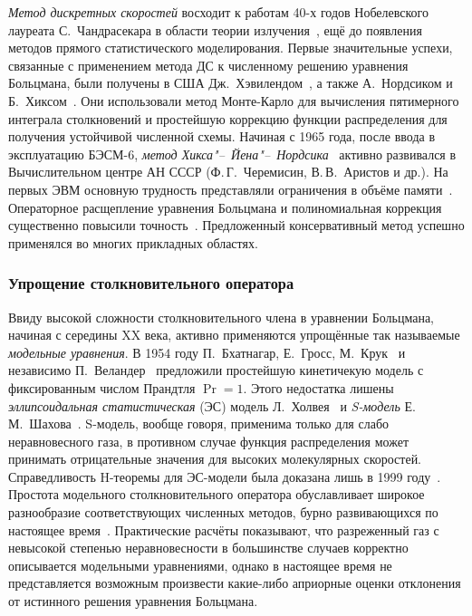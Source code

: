 \emph{Метод дискретных скоростей} восходит к работам 40-х годов Нобелевского лауреата С.~Чандрасекара
в области теории излучения~\cite{Chandrasekhar1950}, ещё до появления методов прямого статистического моделирования.
Первые значительные успехи, связанные с применением метода ДС к численному решению уравнения Больцмана,
были получены в США Дж.~Хэвилендом~\cite{Haviland1965, Haviland1970}, а также А.~Нордсиком и Б.~Хиксом~\cite{Nordsieck1966, Nordsieck1970}.
Они использовали метод Монте-Карло для вычисления пятимерного интеграла столкновений
и простейшую коррекцию функции распределения для получения устойчивой численной схемы.
Начиная с 1965 года, после ввода в эксплуатацию БЭСМ-6, \emph{метод Хикса"--~Йена"--~Нордсика}~\cite{Nordsieck1966, Yen1984}
активно развивался в Вычислительном центре АН СССР (Ф.\,Г.~Черемисин, В.\,В.~Аристов и др.).
На первых ЭВМ основную трудность представляли ограничения в объёме памяти~\cite{Tcheremissine1970}.
Операторное расщепление уравнения Больцмана и полиномиальная коррекция существенно повысили точность~\cite{Tcheremissine1980}.
Предложенный консервативный метод успешно применялся во многих прикладных областях.

\subsubsection{Упрощение столкновительного оператора}

Ввиду высокой сложности столкновительного члена в уравнении Больцмана, начиная с середины XX века,
активно применяются упрощённые так называемые \emph{модельные уравнения}.
В 1954 году П.~Бхатнагар, Е.~Гросс, М.~Крук~\cite{Krook1954} и независимо П.~Веландер~\cite{Welander1954}
предложили простейшую кинетичекую модель с фиксированным числом Прандтля \(\Pr=1\).
Этого недостатка лишены \emph{эллипсоидальная статистическая} (ЭС) модель Л.~Холвея~\cite{Holway1963, Holway1966}
и \emph{S-модель} Е.\,М.~Шахова~\cite{Shakhov1968}.
S-модель, вообще говоря, применима только для слабо неравновесного газа,
в противном случае функция распределения может принимать отрицательные значения для высоких молекулярных скоростей.
Справедливость H-теоремы для ЭС-модели была доказана лишь в 1999 году~\cite{Perthame2000}.
Простота модельного столкновительного оператора обуславливает широкое разнообразие соответствующих численных методов,
бурно развивающихся по настоящее время~\cite{Dimarco2014}.
Практические расчёты показывают, что разреженный газ с невысокой степенью неравновесности в большинстве случаев
корректно описывается модельными уравнениями, однако в настоящее время не представляется возможным произвести какие-либо
априорные оценки отклонения от истинного решения уравнения Больцмана.

